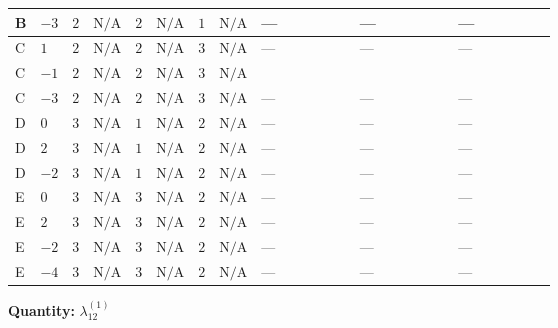 \documentclass[8pt]{article}
\begin{document}
\begin{landscape}
\begin{longtable}{@{}llcccccc >{\raggedright\arraybackslash}p{0.21\linewidth} >{\raggedright\arraybackslash}p{0.21\linewidth} >{\raggedright\arraybackslash}p{0.21\linewidth}@{}}
\midrule
B & $-3$ & $2$ & $\text{N/A}$ & $2$ & $\text{N/A}$ & $1$ & $\text{N/A}$ & --- & --- & --- \\
\midrule
C & $1$ & $2$ & $\text{N/A}$ & $2$ & $\text{N/A}$ & $3$ & $\text{N/A}$ & --- & --- & --- \\
\midrule
C & $-1$ & $2$ & $\text{N/A}$ & $2$ & $\text{N/A}$ & $3$ & $\text{N/A}$ & \scriptsize\adjustbox{max width=\linewidth}{$\begin{gathered} +{\lambda_{X_{17}}^{(1)}} (\left({\lambda_{H H^\dagger S_1^\dagger S_2^\dagger}^{\rm Cross}}\right)^{*}+2 \left({\lambda_{X_{17}}^{(1)}}\right)^{*})\end{gathered}$} & \scriptsize\adjustbox{max width=\linewidth}{$\begin{gathered} +24 {\lambda_{9}} \left({\lambda_{9}}\right)^{*}\end{gathered}$} & \scriptsize\adjustbox{max width=\linewidth}{$\begin{gathered} +9 {\lambda_{10}} (\left({\lambda_{10}}\right)^{*}+\left({\lambda_{11}}\right)^{*}) \\ +9 {\lambda_{11}} (\left({\lambda_{10}}\right)^{*}+\left({\lambda_{11}}\right)^{*})\end{gathered}$} \\
\midrule
C & $-3$ & $2$ & $\text{N/A}$ & $2$ & $\text{N/A}$ & $3$ & $\text{N/A}$ & --- & --- & --- \\
\midrule
D & $0$ & $3$ & $\text{N/A}$ & $1$ & $\text{N/A}$ & $2$ & $\text{N/A}$ & --- & --- & --- \\
\midrule
D & $2$ & $3$ & $\text{N/A}$ & $1$ & $\text{N/A}$ & $2$ & $\text{N/A}$ & --- & --- & --- \\
\midrule
D & $-2$ & $3$ & $\text{N/A}$ & $1$ & $\text{N/A}$ & $2$ & $\text{N/A}$ & --- & --- & --- \\
\midrule
E & $0$ & $3$ & $\text{N/A}$ & $3$ & $\text{N/A}$ & $2$ & $\text{N/A}$ & --- & --- & --- \\
\midrule
E & $2$ & $3$ & $\text{N/A}$ & $3$ & $\text{N/A}$ & $2$ & $\text{N/A}$ & --- & --- & --- \\
\midrule
E & $-2$ & $3$ & $\text{N/A}$ & $3$ & $\text{N/A}$ & $2$ & $\text{N/A}$ & --- & --- & --- \\
\midrule
E & $-4$ & $3$ & $\text{N/A}$ & $3$ & $\text{N/A}$ & $2$ & $\text{N/A}$ & --- & --- & --- \\
\midrule
\bottomrule
\end{longtable}
\clearpage
\noindent\textbf{Quantity: }$\lambda_{12}^{(1)}$\par\smallskip

\end{landscape}
\end{document}
